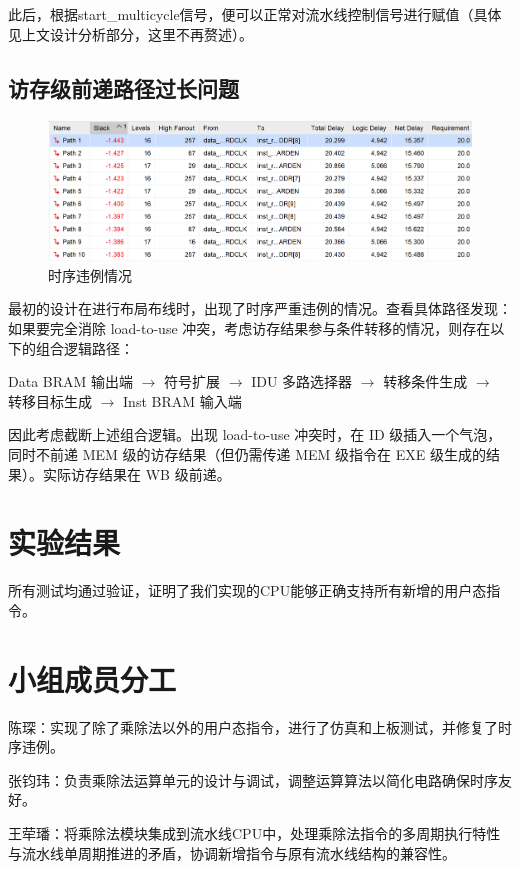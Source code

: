 \documentclass[11pt]{article}
\begin{document}
此后，根据start\_multicycle信号，便可以正常对流水线控制信号进行赋值（具体见上文设计分析部分，这里不再赘述）。

\subsection{访存级前递路径过长问题}

\begin{figure}[H]
  \centering
  \includegraphics[width=\textwidth]{fig/timing_violation.png}
  \caption{时序违例情况}
  \label{fig:timing_violation}
\end{figure}

最初的设计在进行布局布线时，出现了时序严重违例的情况。查看具体路径发现：如果要完全消除 load-to-use 冲突，考虑访存结果参与条件转移的情况，则存在以下的组合逻辑路径：

Data BRAM 输出端 $\longrightarrow$ 符号扩展 $\longrightarrow$ IDU 多路选择器 $\longrightarrow$ 转移条件生成 $\longrightarrow$ 转移目标生成 $\longrightarrow$ Inst BRAM 输入端

因此考虑截断上述组合逻辑。出现 load-to-use 冲突时，在 ID 级插入一个气泡，同时不前递 MEM 级的访存结果（但仍需传递 MEM 级指令在 EXE 级生成的结果）。实际访存结果在 WB 级前递。

\section{实验结果}


所有测试均通过验证，证明了我们实现的CPU能够正确支持所有新增的用户态指令。


\section{小组成员分工}

陈琛：实现了除了乘除法以外的用户态指令，进行了仿真和上板测试，并修复了时序违例。

张钧玮：负责乘除法运算单元的设计与调试，调整运算算法以简化电路确保时序友好。

王荦璠：将乘除法模块集成到流水线CPU中，处理乘除法指令的多周期执行特性与流水线单周期推进的矛盾，协调新增指令与原有流水线结构的兼容性。
\end{document}

